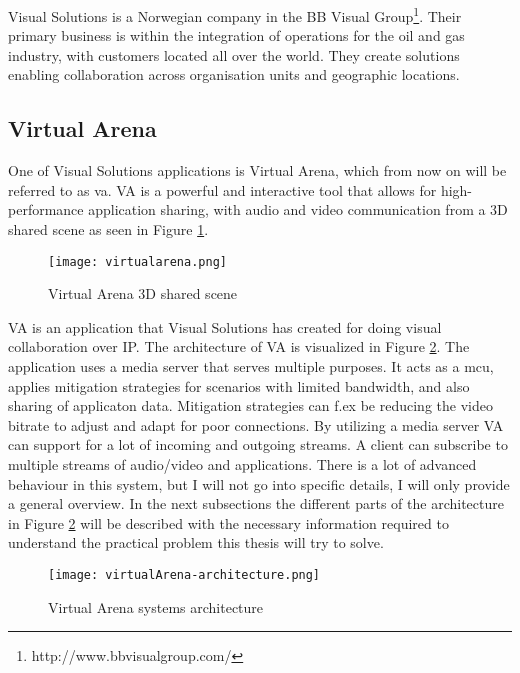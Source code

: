 Visual Solutions is a Norwegian company in the BB Visual Group\footnote{http://www.bbvisualgroup.com/}. Their primary business is within the integration of operations for the oil and gas industry, with customers located all over the world. They create solutions enabling collaboration across organisation units and geographic locations.

\subsection{Virtual Arena}
One of Visual Solutions applications is Virtual Arena\cite{solutions_b2_virtual_2014}, which from now on will be referred to as \gls{va}. VA is a powerful and interactive tool that allows for high-performance application sharing, with audio and video communication from a 3D shared scene as seen in Figure \ref{fig:vsva-3d-scene}.
\\
\begin{figure}[here]
\centerline{\texttt{[image: virtualarena.png]}}
\caption{Virtual Arena 3D shared scene}
\label{fig:vsva-3d-scene}
\end{figure}


VA is an application that Visual Solutions has created for doing visual collaboration over IP. The architecture of VA is visualized in Figure \ref{fig:vsva-architecture}. The application uses a media server that serves multiple purposes. It acts as a \gls{mcu}, applies mitigation strategies for scenarios with limited bandwidth, and also sharing of applicaton data. Mitigation strategies can f.ex be reducing the video bitrate to adjust and adapt for poor connections. By utilizing a media server VA can support for a lot of incoming and outgoing streams. A client can subscribe to multiple streams of audio/video and applications. There is a lot of advanced behaviour in this system, but I will not go into specific details, I will only provide a general overview. In the next subsections the different parts of the architecture in Figure \ref{fig:vsva-architecture} will be described with the necessary information required to understand the practical problem this thesis will try to solve. 

\begin{figure}[here]
\centerline{\texttt{[image: virtualArena-architecture.png]}}
\caption{Virtual Arena systems architecture}
\label{fig:vsva-architecture}
\end{figure}

